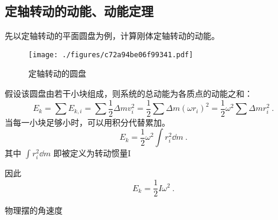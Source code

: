 
\begin{issues}
\issueDraft
{}
\end{issues}


\subsection{定轴转动的动能、动能定理}
先以定轴转动的平面圆盘为例，计算刚体定轴转动的动能。
\begin{figure}[ht]
\centering
\texttt{[image: ./figures/c72a94be06f99341.pdf]}
\caption{定轴转动的圆盘} \label{fig_RigEng_1}
\end{figure}
假设该圆盘由若干小块组成，则系统的总动能为各质点的动能之和：
\begin{equation}
E_k=\sum E_{k,i}=\sum \frac{1}{2} \Delta m v_i^2=\frac{1}{2} \sum \Delta m (\omega r_i)^2=\frac{1}{2} \omega^2 \sum \Delta m r_i^2~.
\end{equation}
当每一小块足够小时，可以用积分代替累加。
\begin{equation}
E_k=\frac{1}{2} \omega^2 \int r_i^2 \dd m ~.
\end{equation}
其中 $\int r_i^2 \dd m$ 即被定义为转动惯量I

因此
\begin{equation}
E_k=\frac{1}{2} I \omega^2~.
\end{equation}


\begin{example}{物理摆的角速度}\label{ex_RigEng_1}
\end{example}
